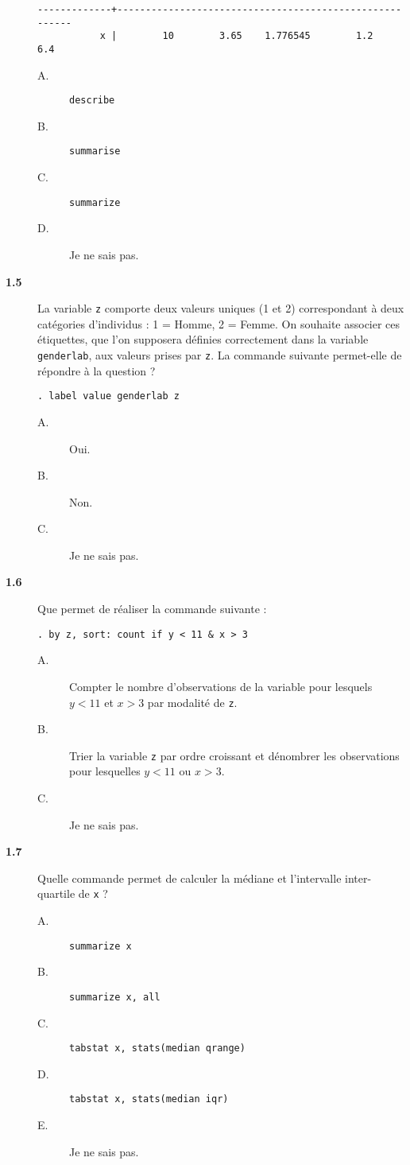 \begin{description}
\begin{verbatim}
-------------+--------------------------------------------------------
           x |        10        3.65    1.776545        1.2        6.4
\end{verbatim}
  \begin{description}
  \item[A.] \verb|describe|
  \item[B.] \verb|summarise|
  \item[C.] \verb|summarize| 
  \item[D.] Je ne sais pas.
  \end{description}
\item[\bf 1.5] La variable \texttt{z} comporte deux valeurs uniques (1 et 2)
  correspondant à deux catégories d'individus : 1 = Homme, 2 = Femme. On
  souhaite associer ces étiquettes, que l'on supposera définies correctement
  dans la variable \texttt{genderlab}, aux valeurs prises par \texttt{z}. La
  commande suivante permet-elle de répondre à la question ? 
\begin{verbatim}
. label value genderlab z
\end{verbatim}
  \begin{description}
  \item[A.] Oui.
  \item[B.] Non.
  \item[C.] Je ne sais pas.
  \end{description}  
\item[\bf 1.6] Que permet de réaliser la commande suivante : 
\begin{verbatim}
. by z, sort: count if y < 11 & x > 3
\end{verbatim}
  \begin{description}
  \item[A.] Compter le nombre d'observations de la variable pour lesquels $y
    < 11$ et $x > 3$ par modalité de \texttt{z}.
  \item[B.] Trier la variable \texttt{z} par ordre croissant et dénombrer
    les observations pour lesquelles $y < 11$ ou $x > 3$.
  \item[C.] Je ne sais pas.
  \end{description}
\item[\bf 1.7] Quelle commande permet de calculer la médiane et l'intervalle
  inter-quartile de \texttt{x} ?
  \begin{description}
  \item[A.] \verb|summarize x|
  \item[B.] \verb|summarize x, all|
  \item[C.] \verb|tabstat x, stats(median qrange)|
  \item[D.] \verb|tabstat x, stats(median iqr)|
  \item[E.] Je ne sais pas.
  \end{description}  

\end{description}
